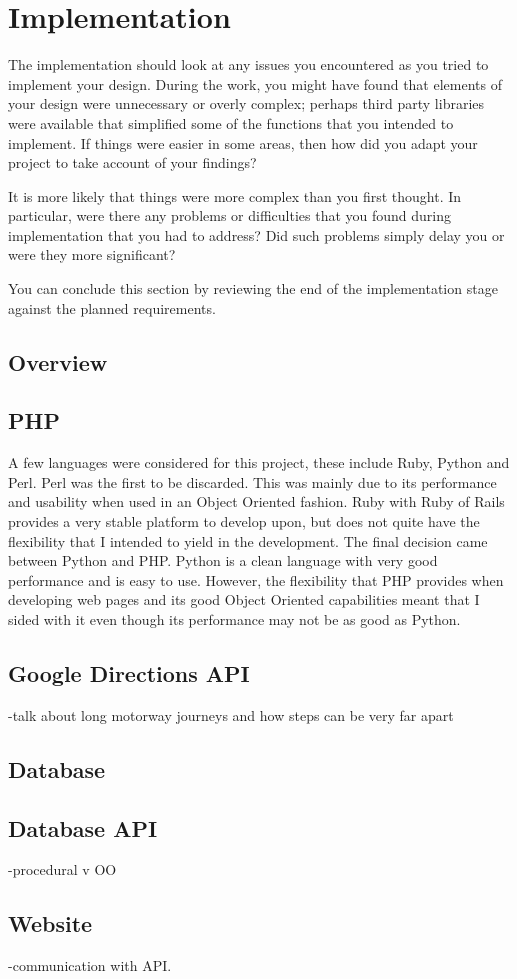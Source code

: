 \chapter{Implementation}

The implementation should look at any issues you encountered as you tried to implement your design. During the work, you might have found that elements of your design were unnecessary or overly complex; perhaps third party libraries were available that simplified some of the functions that you intended to implement. If things were easier in some areas, then how did you adapt your project to take account of your findings?

It is more likely that things were more complex than you first thought. In particular, were there any problems or difficulties that you found during implementation that you had to address? Did such problems simply delay you or were they more significant? 

You can conclude this section by reviewing the end of the implementation stage against the planned requirements. 

\section{Overview}
\section{PHP}
	A few languages were considered for this project, these include Ruby, Python and Perl. Perl was the first to be discarded. This was mainly due to its performance and usability when used in an Object Oriented fashion. Ruby with Ruby of Rails provides a very stable platform to develop upon, but does not quite have the flexibility that I intended to yield in the development. The final decision came between Python and PHP. Python is a clean language with very good performance and is easy to use. However, the flexibility that PHP provides when developing web pages and its good Object Oriented capabilities meant that I sided with it even though its performance may not be as good as Python.
\section{Google Directions API}
	-talk about long motorway journeys and how steps can be very far apart
	\section{Database}
	\section{Database API}
	-procedural v OO
	\section{Website}
	-communication with API.
